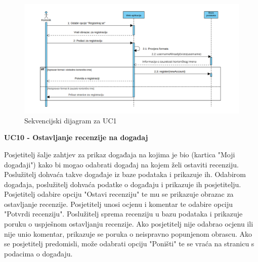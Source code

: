 				\newpage

        \begin{figure}[htbp]
          \centering
          \includegraphics[width=1\textwidth]{dijagrami/uc1_registracija.png}
          \caption{Sekvencijski dijagram za UC1}
        \label{fig:my_image}
        \end{figure}


				\noindent \textbf{UC10 - Ostavljanje recenzije na dogadaj}

				\noindent Posjetitelj šalje zahtjev za prikaz događaja na kojima je bio 
				(kartica "Moji događaji") kako bi mogao odabrati događaj na kojem
				želi ostaviti recenziju. Poslužitelj dohvaća takve događaje iz baze podataka
				i prikazuje ih. Odabirom događaja, poslužitelj dohvaća podatke o događaju
				i prikazuje ih posjetitelju. Posjetitelj odabire opciju "Ostavi recenziju"
				te mu se prikazuje obrazac za ostavljanje recenzije. Posjetitelj unosi
				ocjenu i komentar te odabire opciju "Potvrdi recenziju". Poslužitelj
				sprema recenziju u bazu podataka i prikazuje poruku o uspješnom ostavljanju
				recenzije. Ako posjetitelj nije odabrao ocjenu ili nije unio komentar,
				prikazuje se poruka o neispravno popunjenom obrascu. Ako se posjetitelj
				predomisli, može odabrati opciju "Poništi" te se vraća na stranicu s
				podacima o događaju.

